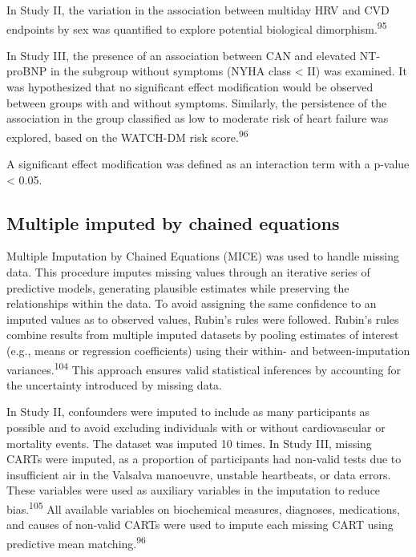\documentclass[
  a4paper,
  headsepline=true,
  open=left]{scrbook}
\begin{document}
In Study II, the variation in the association between multiday HRV and
CVD endpoints by sex was quantified to explore potential biological
dimorphism.\textsuperscript{95}

In Study III, the presence of an association between CAN and elevated
NT-proBNP in the subgroup without symptoms (NYHA class \textless{} II)
was examined. It was hypothesized that no significant effect
modification would be observed between groups with and without symptoms.
Similarly, the persistence of the association in the group classified as
low to moderate risk of heart failure was explored, based on the
WATCH-DM risk score.\textsuperscript{96}

A significant effect modification was defined as an interaction term
with a p-value \textless{} 0.05.

\hypertarget{multiple-imputed-by-chained-equations}{%
\subsection{Multiple imputed by chained
equations}\label{multiple-imputed-by-chained-equations}}

Multiple Imputation by Chained Equations (MICE) was used to handle
missing data. This procedure imputes missing values through an iterative
series of predictive models, generating plausible estimates while
preserving the relationships within the data. To avoid assigning the
same confidence to an imputed values as to observed values, Rubin's
rules were followed. Rubin's rules combine results from multiple imputed
datasets by pooling estimates of interest (e.g., means or regression
coefficients) using their within- and between-imputation
variances.\textsuperscript{104} This approach ensures valid statistical
inferences by accounting for the uncertainty introduced by missing data.

In Study II, confounders were imputed to include as many participants as
possible and to avoid excluding individuals with or without
cardiovascular or mortality events. The dataset was imputed 10 times. In
Study III, missing CARTs were imputed, as a proportion of participants
had non-valid tests due to insufficient air in the Valsalva manoeuvre,
unstable heartbeats, or data errors. These variables were used as
auxiliary variables in the imputation to reduce
bias.\textsuperscript{105} All available variables on biochemical
measures, diagnoses, medications, and causes of non-valid CARTs were
used to impute each missing CART using predictive mean
matching.\textsuperscript{96}
\end{document}
